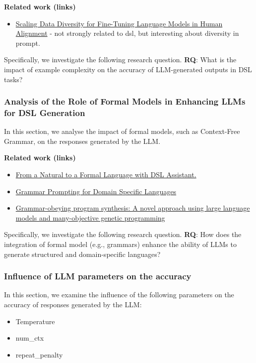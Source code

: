 \textbf{Related work (links)}
\begin{itemize}
    \item \href{http://www.lrec-conf.org/proceedings/lrec-coling-2024/pdf/2024.main-1.1251.pdf}{Scaling Data Diversity for Fine-Tuning Language Models in Human Alignment} - not strongly related to dsl, but interesting about diversity in prompt.
\end{itemize}

Specifically, we investigate the following research question.
\textbf{RQ}: What is the impact of example complexity on the accuracy of LLM-generated outputs in DSL tasks?

\subsubsection{Analysis of the Role of Formal Models in Enhancing LLMs for DSL Generation}

In this section, we analyse the impact of formal models, such as Context-Free Grammar, on the responses generated by the LLM.

\textbf{Related work (links)}
\begin{itemize}
    \item \href{https://dl.acm.org/doi/10.1145/3652620.3687811}{From a Natural to a Formal Language with DSL Assistant.}
    \item \href{https://proceedings.neurips.cc/paper_files/paper/2023/file/cd40d0d65bfebb894ccc9ea822b47fa8-Paper-Conference.pdf}{Grammar Prompting for Domain Specific Languages}
    \item \href{https://www.sciencedirect.com/science/article/abs/pii/S0920548924001077}{Grammar-obeying program synthesis: A novel approach using large language models and many-objective genetic programming}
\end{itemize}

Specifically, we investigate the following research question.
\textbf{RQ}: How does the integration of formal model (e.g., grammars) enhance the ability of LLMs to generate structured and domain-specific languages?

\subsubsection{Influence of LLM parameters on the accuracy}
In this section, we examine the influence of the following parameters on the accuracy of responses generated by the LLM:

\begin{itemize}
    \item Temperature
    \item num\_ctx
    \item repeat\_penalty
\end{itemize}


